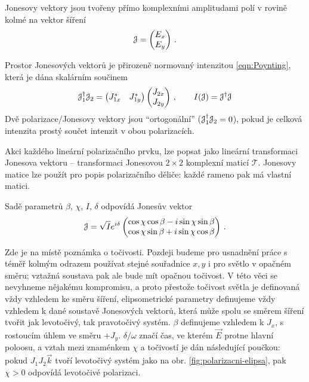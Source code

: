Jonesovy vektory\cite{azzamEllipsometryPolarizedLight1977} jsou tvořeny přímo komplexními amplitudami polí v rovině kolmé na vektor šíření
\begin{equation}
    \mathcal{J}=\begin{pmatrix} E_{x} \\ E_{y} \end{pmatrix} \,.
\end{equation}

Prostor Jonesových vektorů je přirozeně normovaný intenzitou \eqref{eqn:Poynting}, která je dána skalárním součinem
\begin{equation}
    \mathcal{J}_1^\dagger \mathcal{J}_2= \begin{pmatrix} J_{1x}^* & J_{1y}^* \end{pmatrix}
    \begin{pmatrix} J_{2x} \\ J_{2y} \end{pmatrix} \,, 
    \qquad I(\mathcal{J})=\mathcal{J}^\dagger \mathcal{J}
\end{equation}
Dvě polarizace/Jonesovy vektory jsou ``ortogonální'' ($\mathcal{J}_1^\dagger \mathcal{J}_2=0$), pokud je celková intenzita prostý součet intenzit v obou polarizacích.

Akci každého lineární polarizačního prvku, lze popsat jako lineární transformaci Jonesova vektoru -- transformaci Jonesovou $2\times 2$ komplexní maticí $\mathcal{T}$.
Jonesovy matice lze použít pro popis polarizačního děliče: každé rameno pak má vlastní matici.

Sadě parametrů $\beta$, $\chi$, $I$, $\delta$ odpovídá Jonesův vektor
\begin{equation} 
\label{eqn:Jones-elipsa}
    \mathcal{J}=\sqrt{I} e^{i\delta} \begin{pmatrix}
        \cos \chi \cos \beta - i \sin \chi \sin \beta \\
        \cos \chi \sin \beta + i \sin \chi \cos \beta
    \end{pmatrix} \,.
\end{equation}

Zde je na místě poznámka o točivosti.
Pozdeji budeme pro usnadnění práce s téměř kolmým odrazem používat stejné souřadnice $x,y$ i pro světlo v opačném směru; vztažná soustava pak ale bude mít opačnou točivost.
V této věci se nevyhneme nějakému kompromisu, a proto přestože točivost světla je definovaná vždy vzhledem ke směru šíření, elipsometrické parametry definujeme vždy vzhledem k dané soustavě Jonesových vektorů, která může spolu se směrem šíření tvořit jak levotočivý, tak pravotočivý systém.
$\beta$ definujeme vzhledem k $J_x$, s rostoucím úhlem ve směru $+J_y$.
$\delta/\omega$ značí čas, ve kterém $\vec{E}$ protne hlavní poloosu, a vztah mezi znaménkem $\chi$ a točivostí je dán následující poučkou: pokud $J_1 J_2 \vec{k}$ tvoří levotočivý systém jako na obr. \ref{fig:polarizacni-elipsa}, pak $\chi>0$ odpovídá levotočivé polarizaci.

